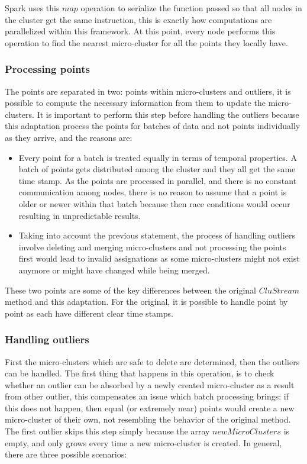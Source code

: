 Spark uses this $map$ operation to serialize the function passed so that all nodes in the cluster get the same instruction, this is exactly how computations are parallelized  within this framework. At this point, every node performs this operation to find the nearest micro-cluster for all the points they locally have.



\subsubsection{Processing points}\label{procpoints}

The points are separated in two: points within micro-clusters and outliers, it is possible to compute the necessary information from them to update the micro-clusters. It is important to perform this step before handling the outliers because this adaptation process the points for batches of data and not points individually as they arrive, and the reasons are:

\begin{itemize}
 \item Every point for a batch is treated equally in terms of temporal properties. A batch of points gets distributed among the cluster and they all get the same time stamp. As the points are processed in parallel, and there is no constant communication among nodes, there is no reason to assume that a point is older or newer within that batch because then race conditions would occur resulting in unpredictable results.
\item Taking into account the previous statement, the process of handling outliers involve deleting and merging micro-clusters and not processing the points first would lead to invalid assignations as some micro-clusters might not exist anymore or might have changed while being merged.
\end{itemize}

These two points are some of the key differences between the original $CluStream$ method and this adaptation. For the original, it is possible to handle point by point as each have different clear time stamps.


\subsubsection{Handling outliers}\label{handlingoutliers}


First the micro-clusters which are safe to delete are determined, then the outliers can be handled. The first thing that happens in this operation, is to check whether an outlier can be absorbed by a newly created micro-cluster as a result from other outlier, this compensates an issue which batch processing brings: if this does not happen, then equal (or extremely near) points would create a new micro-cluster of their own, not resembling the behavior of the original method. The first outlier skips this step simply because the array $newMicroClusters$ is empty, and only grows every time a new micro-cluster is created. In general, there are three possible scenarios:

